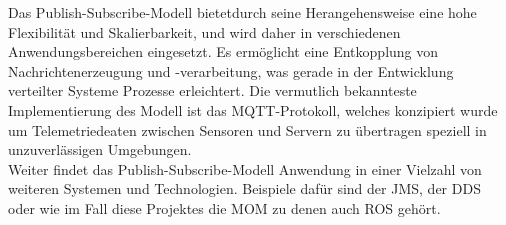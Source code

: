 Das Publish-Subscribe-Modell bietetdurch seine Herangehensweise eine hohe Flexibilität und Skalierbarkeit, und wird daher in verschiedenen Anwendungsbereichen eingesetzt. Es ermöglicht eine Entkopplung von Nachrichtenerzeugung und -verarbeitung, was gerade in der Entwicklung verteilter Systeme Prozesse erleichtert. Die vermutlich bekannteste Implementierung des Modell ist das MQTT-Protokoll, welches konzipiert wurde um Telemetriedeaten zwischen Sensoren und Servern zu übertragen speziell in unzuverlässigen Umgebungen\cite{elektronik_kompendium_publish_subscribe}.\\
Weiter findet das Publish-Subscribe-Modell Anwendung in einer Vielzahl von weiteren Systemen und Technologien. Beispiele dafür sind der \ac{JMS}, der \ac{DDS} oder wie im Fall diese Projektes die \ac{MOM} zu denen auch \ac{ROS} gehört.\\


